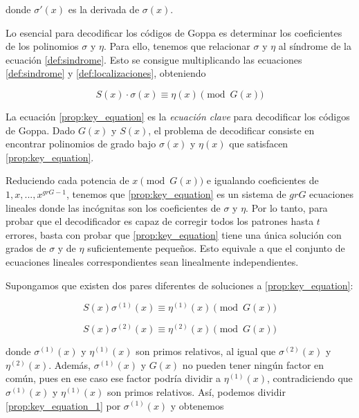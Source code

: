 donde $\sigma'(x)$ es la derivada de $\sigma(x)$.

Lo esencial para decodificar los códigos de Goppa es determinar los coeficientes de los polinomios $\sigma$ y $\eta$. Para ello, tenemos que relacionar $\sigma$ y $\eta$ al síndrome de la ecuación \ref{def:sindrome}. Esto se consigue multiplicando las ecuaciones \ref{def:sindrome} y \ref{def:localizaciones}, obteniendo

\begin{equation}
    \label{prop:key_equation}
    S(x) \cdot \sigma(x) \equiv \eta(x) \pmod{G(x)}
\end{equation}

La ecuación \ref{prop:key_equation} es la \emph{ecuación clave} para decodificar los códigos de Goppa. Dado $G(x)$ y $S(x)$, el problema de decodificar consiste en encontrar polinomios de grado bajo $\sigma(x)$ y $\eta(x)$ que satisfacen \ref{prop:key_equation}.

Reduciendo cada potencia de $x \pmod{G(x)}$ e igualando coeficientes de $1, x, ..., x^{gr G - 1}$, tenemos que \ref{prop:key_equation} es un sistema de $gr G$ ecuaciones lineales donde las incógnitas son los coeficientes de $\sigma$ y $\eta$. Por lo tanto, para probar que el decodificador es capaz de corregir todos los patrones hasta $t$ errores, basta con probar que \ref{prop:key_equation} tiene una única solución con grados de $\sigma$ y de $\eta$ suficientemente pequeños. Esto equivale a que el conjunto de ecuaciones lineales correspondientes sean linealmente independientes.

Supongamos que existen dos pares diferentes de soluciones a \ref{prop:key_equation}:

\begin{equation}
    \label{prop:key_equation_1}
    S(x) \sigma^{(1)}(x) \equiv \eta^{(1)}(x) \pmod{G(x)}
\end{equation}

\begin{equation}
    \label{prop:key_equation_2}
    S(x) \sigma^{(2)}(x) \equiv \eta^{(2)}(x) \pmod{G(x)}
\end{equation}

donde $\sigma^{(1)}(x)$ y $\eta^{(1)}(x)$ son primos relativos, al igual que $\sigma^{(2)}(x)$ y $\eta^{(2)}(x)$. Además, $\sigma^{(1)}(x)$ y $G(x)$ no pueden tener ningún factor en común, pues en ese caso ese factor podría dividir a $\eta^{(1)}(x)$, contradiciendo que $\sigma^{(1)}(x)$ y $\eta^{(1)}(x)$ son primos relativos. Así, podemos dividir \ref{prop:key_equation_1} por $\sigma^{(1)}(x)$ y obtenemos

